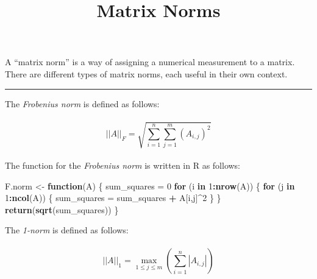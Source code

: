 \documentclass[
]{article}
\title{Matrix Norms}
\author{}
\date{\vspace{-2.5em}}
\newenvironment{Shaded}{\begin{snugshade}}{\end{snugshade}}
\newcommand{\ControlFlowTok}[1]{\textcolor[rgb]{0.13,0.29,0.53}{\textbf{#1}}}
\newcommand{\DecValTok}[1]{\textcolor[rgb]{0.00,0.00,0.81}{#1}}
\newcommand{\KeywordTok}[1]{\textcolor[rgb]{0.13,0.29,0.53}{\textbf{#1}}}
\newcommand{\NormalTok}[1]{#1}
\newcommand{\OperatorTok}[1]{\textcolor[rgb]{0.81,0.36,0.00}{\textbf{#1}}}
\newcommand{\StringTok}[1]{\textcolor[rgb]{0.31,0.60,0.02}{#1}}
\begin{document}
\maketitle

A ``matrix norm'' is a way of assigning a numerical measurement to a
matrix. There are different types of matrix norms, each useful in their
own context.

\begin{center}\rule{0.5\linewidth}{0.5pt}\end{center}

The \emph{Frobenius norm} is defined as follows:

\hypertarget{a_f-sqrtdisplaystyle-sum_i-1nsum_j1ma_ij2}{%
\paragraph{\texorpdfstring{\[||A||_{F} = \sqrt{\displaystyle \sum_{i = 1}^{n}\sum_{j=1}^{m}(A_{i,j})^2}\]}{\textbar\textbar A\textbar\textbar\_\{F\} = \textbackslash sqrt\{\textbackslash displaystyle \textbackslash sum\_\{i = 1\}\^{}\{n\}\textbackslash sum\_\{j=1\}\^{}\{m\}(A\_\{i,j\})\^{}2\}}}\label{a_f-sqrtdisplaystyle-sum_i-1nsum_j1ma_ij2}}

The function for the \emph{Frobenius norm} is written in R as follows:

\begin{Shaded}
\begin{Highlighting}[]
\NormalTok{F.norm \textless{}{-}}\StringTok{ }\ControlFlowTok{function}\NormalTok{(A) \{}
\NormalTok{  sum\_squares =}\StringTok{ }\DecValTok{0}
  \ControlFlowTok{for}\NormalTok{ (i }\ControlFlowTok{in} \DecValTok{1}\OperatorTok{:}\KeywordTok{nrow}\NormalTok{(A)) \{}
    \ControlFlowTok{for}\NormalTok{ (j }\ControlFlowTok{in} \DecValTok{1}\OperatorTok{:}\KeywordTok{ncol}\NormalTok{(A)) \{}
\NormalTok{      sum\_squares =}\StringTok{ }\NormalTok{sum\_squares }\OperatorTok{+}\StringTok{ }\NormalTok{A[i,j]}\OperatorTok{\^{}}\DecValTok{2}
\NormalTok{    \}}
\NormalTok{  \}}
  \KeywordTok{return}\NormalTok{(}\KeywordTok{sqrt}\NormalTok{(sum\_squares))}
\NormalTok{\}}
\end{Highlighting}
\end{Shaded}

The \emph{1-norm} is defined as follows:

\hypertarget{a_1-displaystyle-max_1-le-j-le-msum_i1na_ij}{%
\paragraph{\texorpdfstring{\[||A||_{1} = \displaystyle \max_{1 \le j \le m}(\sum_{i=1}^{n}|A_{i,j}|)\]}{\textbar\textbar A\textbar\textbar\_\{1\} = \textbackslash displaystyle \textbackslash max\_\{1 \textbackslash le j \textbackslash le m\}(\textbackslash sum\_\{i=1\}\^{}\{n\}\textbar A\_\{i,j\}\textbar)}}\label{a_1-displaystyle-max_1-le-j-le-msum_i1na_ij}}
\end{document}
